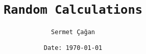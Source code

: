

\title{\texttt{\textbf{Random Calculations}}}
\author{\texttt{Sermet \c{C}a\u{g}an}}
\date{\texttt{Date: \today}}



\maketitle
\newpage

\newpage

\newpage

\newpage

\newpage


